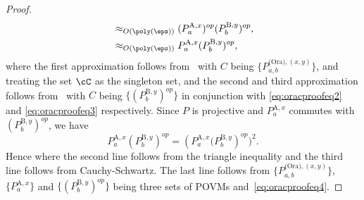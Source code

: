\begin{proof}
\begin{align}
	\notag	&\approx_{O(\poly(\eps))} ( P^{\text{A},x}_a)^{op} ( P^{\text{B},y}_b)^{op}, \\
	&\approx_{O(\poly(\eps))} P^{\text{A},x}_a( P^{\text{B},y}_b)^{op}, \label{eq:oracproofeq4}
\end{align}
where the first approximation follows from~ with $C$ being $\{ P^{\text{(Ora)},(x,y)}_{a,b} \}$, and treating the set $\cC$ as the singleton set, and the second and third approximation follows from~ with $C$ being $\{ ( P^{\text{B},y}_b)^{op}\}$ in conjunction with \eqref{eq:oracproofeq2} and \eqref{eq:oracproofeq3} respectively. Since $P$ is projective and $P^{\text{A},x}_a$ commutes with $(P^{\text{B},y}_b)^{op}$, we have
\begin{equation*}
	P^{\text{A},x}_a( P^{\text{B},y}_b)^{op}= \left(P^{\text{A},x}_a( P^{\text{B},y}_b \right)^{op})^2.
\end{equation*}
Hence
where the second line follows from the triangle inequality and the third line follows from Cauchy-Schwartz. The last line follows from $\{ P^{\text{(Ora)},(x,y)}_{a,b}\}$, $\{ P^{\text{A},x}_a\}$ and $\{( P^{\text{B},y}_b)^{op}\}$ being three sets of POVMs and~\eqref{eq:oracproofeq4}. 


\end{proof}
